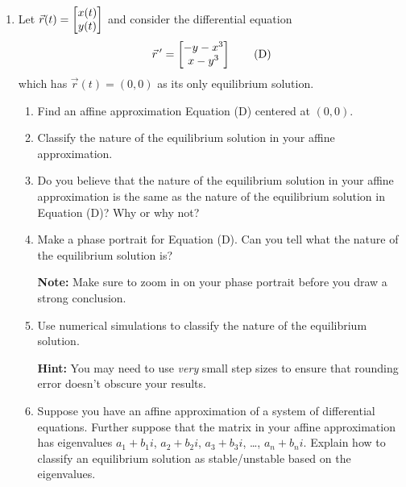 \begin{enumerate}
	\item Let $\vec r(t)=\begin{bmatrix}x(t)\\y(t)\end{bmatrix}$ and consider the differential equation
	      \begin{equation}
		      \vec r\,' = \begin{bmatrix}-y-x^3\\x-y^3\end{bmatrix} \tag{D}
	      \end{equation}
	      which has $\vec r(t)=(0,0)$ as its only equilibrium solution.
	      \begin{enumerate}
		      \item Find an affine approximation Equation (D) centered at $(0,0)$.
		      \item Classify the nature of the equilibrium solution in your affine approximation.
		      \item Do you believe that the nature of the equilibrium solution in your affine approximation
		            is the same as the nature of the equilibrium solution in Equation (D)? Why or why not?
		      \item Make a phase portrait for Equation (D). Can you tell what the nature of the equilibrium solution is?

				  \textbf{Note:} Make sure to zoom in on your phase portrait before you draw a strong conclusion.
		      \item Use numerical simulations to classify the nature of the equilibrium solution.

		            \textbf{Hint:} You may need to use \emph{very} small step sizes to ensure that rounding error
		            doesn't obscure your results.


		      \item Suppose you have an affine approximation of a system of differential equations. Further suppose
		            that the matrix in your affine approximation has eigenvalues $a_1+b_1i$, $a_2+b_2i$, $a_3+b_3i$, \ldots, $a_n+b_ni$.
		            Explain how to classify an equilibrium solution as stable/unstable based on the eigenvalues.

	      \end{enumerate}
\end{enumerate}